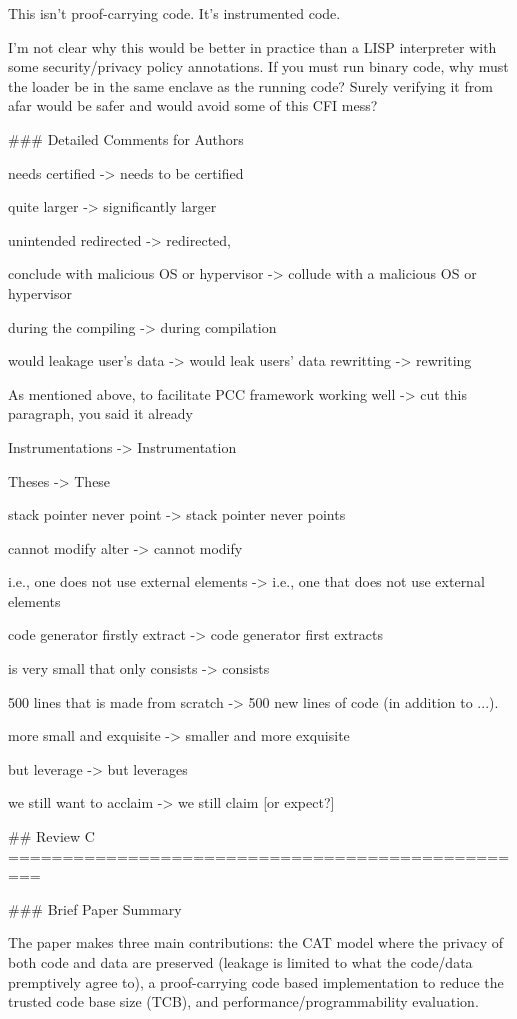 \begin{markdown}
This isn't proof-carrying code.  It's instrumented code.

I'm not clear why this would be better in practice than a LISP interpreter with some security/privacy policy annotations.  If you must run binary code, why must the loader be in the same enclave as the running code?  Surely verifying it from afar would be safer and would avoid some of this CFI mess?

### Detailed Comments for Authors

needs certified -> needs to be certified

quite larger -> significantly larger

unintended redirected -> redirected,

conclude with malicious OS or hypervisor -> collude with a malicious OS or hypervisor

during the compiling -> during compilation

would leakage user's data -> would leak users' data
rewritting -> rewriting

As mentioned above, to facilitate PCC framework working well -> cut this paragraph, you said it already

Instrumentations -> Instrumentation

Theses -> These

stack pointer never point -> stack pointer never points

cannot modify alter -> cannot modify

i.e., one does not use external elements -> i.e., one that does not use external elements

code generator firstly extract -> code generator first extracts

is very small that only consists -> consists

500 lines that is made from scratch -> 500 new lines of code (in addition to ...).

more small and exquisite -> smaller and more exquisite

but leverage -> but leverages

we still want to acclaim -> we still claim [or expect?]




## Review C
=================================================



### Brief Paper Summary

The paper makes three main contributions: the CAT model where the privacy of
both code and data are preserved (leakage is limited to what the code/data
premptively agree to), a proof-carrying code based implementation to reduce
the trusted code base size (TCB), and performance/programmability evaluation.



\end{markdown}
